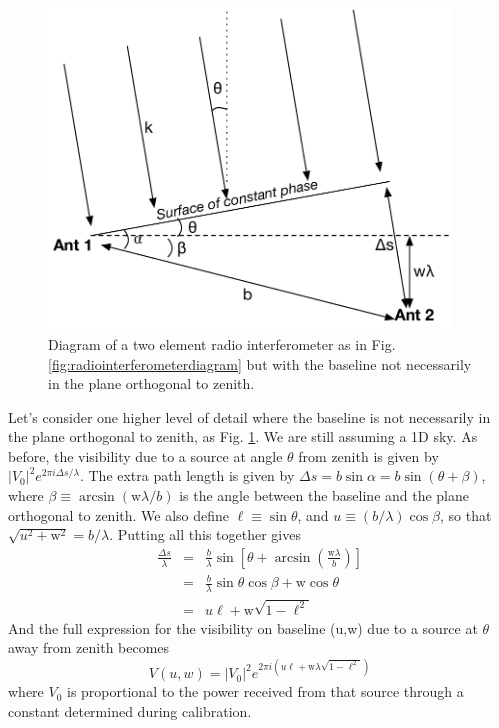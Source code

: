 \begin{figure}[h]
    \centering
    \includegraphics[width=0.95\textwidth]{chap0_intro/radio_interferometer_diagram_with_w.pdf}
    \caption[Diagram of a two element radio interferometer with non-zero $w$.]{Diagram of a two element radio interferometer as in Fig. \ref{fig:radiointerferometerdiagram} but with the baseline not necessarily in the plane orthogonal to zenith.}
    \label{fig:radiointerferometerdiagramwithw}
\end{figure}

Let's consider one higher level of detail where the baseline is not necessarily in the plane orthogonal to zenith, as Fig. \ref{fig:radiointerferometerdiagramwithw}. 
We are still assuming a 1D sky. As before, the visibility due to a source at angle $\theta$ from zenith is given by $|V_0|^2 e^{2\pi i \Delta s/\lambda}$. 
The extra path length is given by $\Delta s=b\sin\alpha=b\sin(\theta+\beta)$, where $\beta\equiv\arcsin (\text{w}\lambda/b)$ is the angle between the baseline and the plane orthogonal to zenith. 
We also define $\ell\equiv\sin\theta$, and
 $u\equiv (b/\lambda)\cos\beta$, 
 so that $\sqrt{u^2+\text{w}^2}=b/\lambda$. 
 Putting all this together gives
\begin{eqnarray}
	\frac{\Delta s}{\lambda} &=& \frac{b}{\lambda}\sin\left[\theta+\arcsin\left(\frac{\text{w}\lambda}{b}\right)\right]\\
	 &=& \frac{b}{\lambda}\sin\theta\cos\beta+\text{w}\cos\theta\\
	 &=& u\ell+\text{w}\sqrt{1-\ell^2}
\end{eqnarray}
And the full expression for the visibility on baseline (u,w) due to a source at $\theta$ away from zenith becomes 
\begin{equation}
	V(u,w)=|V_0|^2 e^{2\pi i (u\ell+\text{w}\lambda\sqrt{1-\ell^2})}
\end{equation}
where $V_0$ is proportional to the power received from that source through a constant determined during calibration. 

